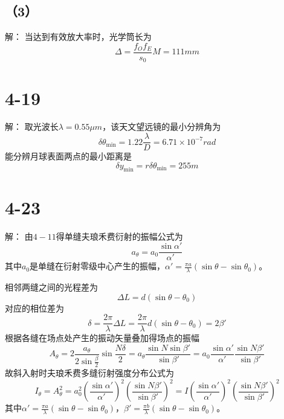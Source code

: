 \documentclass[10pt,a4paper]{article}
\begin{document}
\subsection*{（3）}解：
当达到有效放大率时，光学筒长为
\[
\Delta=\frac{f_Of_E}{s_0}M=111mm
\]
\section*{4-19}解：
取光波长$\lambda=0.55\mu m$，该天文望远镜的最小分辨角为
\[
\delta\theta_{\min}=1.22\frac{\lambda}{D}=6.71\times10^{-7}rad
\]
能分辨月球表面两点的最小距离是
\[
\delta y_{\min}=r\delta\theta_{\min}=255m
\]
\section*{4-23}解：
由$4-11$得单缝夫琅禾费衍射的振幅公式为
\[
a_{\theta}=a_0\frac{\sin\alpha'}{\alpha'}
\]
其中$a_0$是单缝在衍射零级中心产生的振幅，$\alpha'=\frac{\pi a}{\lambda}(\sin\theta-\sin\theta_0)$。

\noindent 相邻两缝之间的光程差为
\[
\Delta L=d(\sin\theta-\theta_0)
\]
对应的相位差为
\[
\delta=\frac{2\pi}{\lambda}\Delta L=\frac{2\pi}{\lambda}d(\sin\theta-\theta_0)=2\beta'
\]
根据各缝在场点处产生的振动矢量叠加得场点的振幅
\[
A_{\theta}=2\frac{a_\theta}{2\sin\frac{\beta}{2}}\sin\frac{N\delta}{2}=a_{\theta}\frac{\sin N\sin\beta'}{\sin\beta'}=a_0\frac{\sin\alpha'}{\alpha'}\frac{\sin N\beta'}{\sin\beta'}
\]
故斜入射时夫琅禾费多缝衍射强度分布公式为
\[
I_{\theta}=A_{\theta}^2=a_0^2(\frac{\sin\alpha'}{\alpha'})^2(\frac{\sin N\beta'}{\sin\beta'})^2=I(\frac{\sin\alpha'}{\alpha'})^2(\frac{\sin N\beta'}{\sin\beta'})^2
\]
其中$\alpha'=\frac{\pi a}{\lambda}(\sin\theta-\sin\theta_0)$，$\beta'=\frac{\pi b}{\lambda}(\sin\theta-\sin\theta_0)$。
\end{document}
